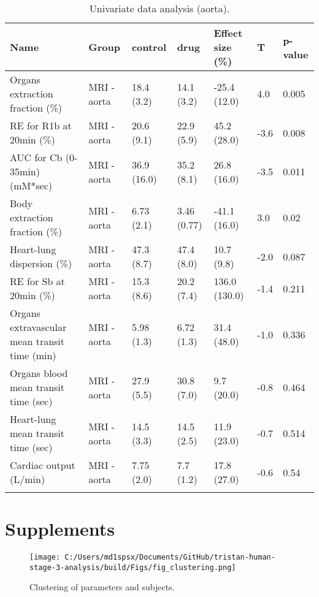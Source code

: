 \documentclass{epflreport}%
\begin{document}
\clearpage%
\begin{longtable}{|p{1.5cm}|p{1.5cm}|p{1.5cm}|p{1.5cm}|p{1.5cm}|p{1.5cm}|p{1.5cm}|}%
\hline%
Name&Group&control&drug&Effect size (\%)&T&p{-}value\\%
\hline%
Organs extraction fraction (\%)&MRI {-} aorta&18.4 (3.2) &14.1 (3.2) &{-}25.4 (12.0) &4.0&0.005\\%
RE for R1b at 20min (\%)&MRI {-} aorta&20.6 (9.1) &22.9 (5.9) &45.2 (28.0) &{-}3.6&0.008\\%
AUC for Cb (0{-}35min) (mM*sec)&MRI {-} aorta&36.9 (16.0) &35.2 (8.1) &26.8 (16.0) &{-}3.5&0.011\\%
Body extraction fraction (\%)&MRI {-} aorta&6.73 (2.1) &3.46 (0.77) &{-}41.1 (16.0) &3.0&0.02\\%
Heart{-}lung dispersion (\%)&MRI {-} aorta&47.3 (8.7) &47.4 (8.0) &10.7 (9.8) &{-}2.0&0.087\\%
RE for Sb at 20min (\%)&MRI {-} aorta&15.3 (8.6) &20.2 (7.4) &136.0 (130.0) &{-}1.4&0.211\\%
Organs extravascular mean transit time (min)&MRI {-} aorta&5.98 (1.3) &6.72 (1.3) &31.4 (48.0) &{-}1.0&0.336\\%
Organs blood mean transit time (sec)&MRI {-} aorta&27.9 (5.5) &30.8 (7.0) &9.7 (20.0) &{-}0.8&0.464\\%
Heart{-}lung mean transit time (sec)&MRI {-} aorta&14.5 (3.3) &14.5 (2.5) &11.9 (23.0) &{-}0.7&0.514\\%
Cardiac output (L/min)&MRI {-} aorta&7.75 (2.0) &7.7 (1.2) &17.8 (27.0) &{-}0.6&0.54\\%
\hline%
\caption{Univariate data analysis (aorta).} \\%
\end{longtable}%
\clearpage%
\chapter{Supplements}%
\clearpage%


\begin{figure}[h!]%
\centering%
\texttt{[image: C:/Users/md1spsx/Documents/GitHub/tristan-human-stage-3-analysis/build/Figs/fig\_clustering.png]}%
\caption{Clustering of parameters and subjects.}%
\end{figure}

%
\end{document}
